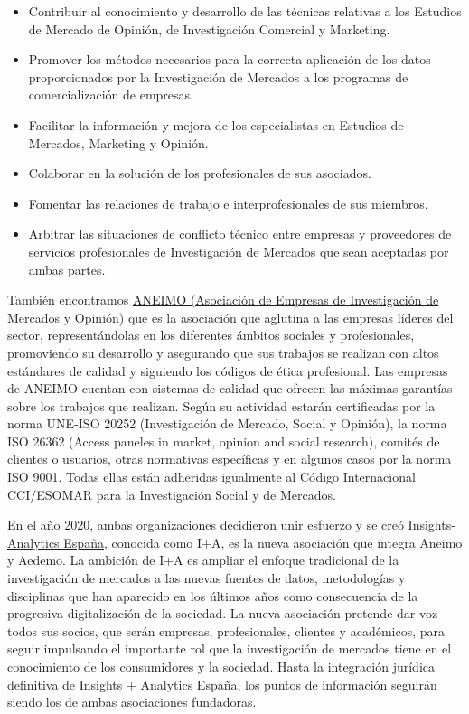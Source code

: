 \documentclass[
]{book}
\providecommand{\tightlist}{%
  \setlength{\itemsep}{0pt}\setlength{\parskip}{0pt}}
\begin{document}
\begin{itemize}
\tightlist
\item
  Contribuir al conocimiento y desarrollo de las técnicas relativas a los Estudios de Mercado de Opinión, de Investigación Comercial y Marketing.
\item
  Promover los métodos necesarios para la correcta aplicación de los datos proporcionados por la Investigación de Mercados a los programas de comercialización de empresas.
\item
  Facilitar la información y mejora de los especialistas en Estudios de Mercados, Marketing y Opinión.
\item
  Colaborar en la solución de los profesionales de sus asociados.
\item
  Fomentar las relaciones de trabajo e interprofesionales de sus miembros.
\item
  Arbitrar las situaciones de conflicto técnico entre empresas y proveedores de servicios profesionales de Investigación de Mercados que sean aceptadas por ambas partes.
\end{itemize}

También encontramos \href{http://www.aneimo.com/}{ANEIMO (Asociación de Empresas de Investigación de Mercados y Opinión)} que es la asociación que aglutina a las empresas líderes del sector, representándolas en los diferentes ámbitos sociales y profesionales, promoviendo su desarrollo y asegurando que sus trabajos se realizan con altos estándares de calidad y siguiendo los códigos de ética profesional. Las empresas de ANEIMO cuentan con sistemas de calidad que ofrecen las máximas garantías sobre los trabajos que realizan. Según su actividad estarán certificadas por la norma UNE-ISO 20252 (Investigación de Mercado, Social y Opinión), la norma ISO 26362 (Access paneles in market, opinion and social research), comités de clientes o usuarios, otras normativas específicas y en algunos casos por la norma ISO 9001. Todas ellas están adheridas igualmente al Código Internacional CCI/ESOMAR para la Investigación Social y de Mercados.

En el año 2020, ambas organizaciones decidieron unir esfuerzo y se creó \href{http://ia-espana.es/}{Insights-Analytics España}, conocida como I+A, es la nueva asociación que integra Aneimo y Aedemo. La ambición de I+A es ampliar el enfoque tradicional de la investigación de mercados a las nuevas fuentes de datos, metodologías y disciplinas que han aparecido en los últimos años como consecuencia de la progresiva digitalización de la sociedad. La nueva asociación pretende dar voz todos sus socios, que serán empresas, profesionales, clientes y académicos, para seguir impulsando el importante rol que la investigación de mercados tiene en el conocimiento de los consumidores y la sociedad. Hasta la integración jurídica definitiva de Insights + Analytics España, los puntos de información seguirán siendo los de ambas asociaciones fundadoras.
\end{document}
